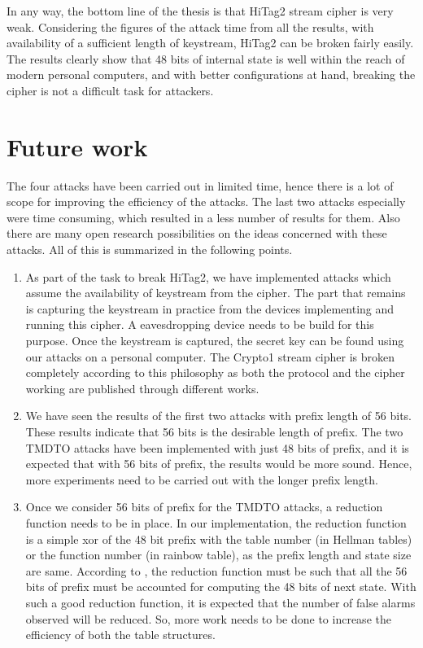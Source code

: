 In any way, the bottom line of the thesis is that HiTag2 stream cipher is very weak. Considering the figures of the attack time from all the results, with availability of a sufficient length of keystream, HiTag2 can be broken fairly easily. The results clearly show that 48 bits of internal state is well within the reach of modern personal computers, and with better configurations at hand, breaking the cipher is not a difficult task for attackers.
\section{Future work}

The four attacks have been carried out in limited time, hence there is a lot of scope for improving the efficiency of the attacks. The last two attacks especially were time consuming, which resulted in a less number of results for them. Also there are many open research possibilities on the ideas concerned with these attacks. All of this is summarized in the following points. 

\begin{enumerate}
\item As part of the task to break HiTag2, we have implemented attacks which assume the availability of keystream from the cipher. The part that remains is capturing the keystream in practice from the devices implementing and running this cipher. A eavesdropping device needs to be build for this purpose. Once the keystream is captured, the secret key can be found using our attacks on a personal computer. The Crypto1 stream cipher is broken completely according to this philosophy as both the protocol and the cipher working are published through different works. 

\item We have seen the results of the first two attacks with prefix length of 56 bits. These results indicate that 56 bits is the desirable length of prefix. The two TMDTO attacks have been implemented with just 48 bits of prefix, and it is expected that with 56 bits of prefix, the results would be more sound. Hence, more experiments need to be carried out with the longer prefix length.

\item Once we consider 56 bits of prefix for the TMDTO attacks, a reduction function needs to be in place. In our implementation, the reduction function is a simple xor of the 48 bit prefix with the table number (in Hellman tables) or the function number (in rainbow table), as the prefix length and state size are same. According to \cite{email-karsten}, the reduction function must be such that all the 56 bits of prefix must be accounted for computing the 48 bits of next state. With such a good reduction function, it is expected that the number of false alarms observed will be reduced. So, more work needs to be done to increase the efficiency of both the table structures.

\end{enumerate}